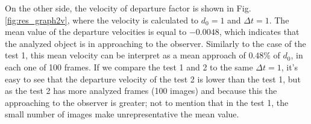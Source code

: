 On the other side, the velocity of departure factor is shown in 
Fig. \ref{fig:res_graph2v}, where the velocity is calculated
to $d_0=1$ and $\Delta t=1$. The mean value of the departure
velocities is equal to $-0.0048$, which indicates that the
analyzed object is in approaching to the observer. Similarly
to the case of the test 1, this mean velocity can be interpret
as a mean approach of $0.48\%$ of $d_0$, in each one of 100 frames.
If we compare the test 1 and 2 to the same $\Delta t=1$, it's easy to see
that the departure velocity of the test 2  is lower than the test 1, 
but as the test 2 has more analyzed frames (100 images)
and because this the approaching to the observer is greater; 
not to mention that in the test 1, the small number of images 
make  unrepresentative the mean value.




